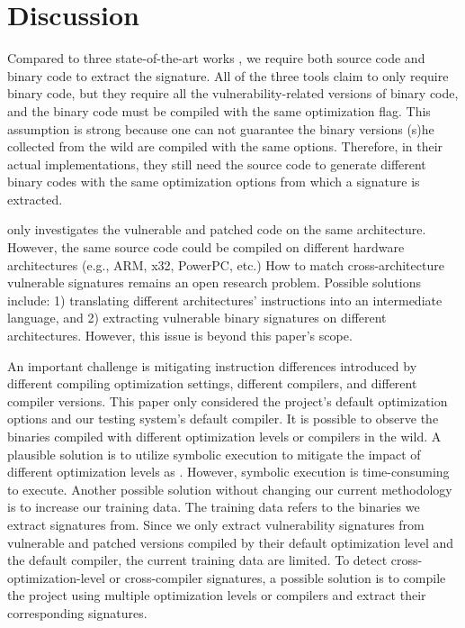 \section{Discussion}
\label{sec:dis}

 Compared to three state-of-the-art works \cite{vmpbl,binxray,viva}, we require both source code and binary code to extract the signature.
All of the three tools \cite{vmpbl,binxray,viva} claim to only require binary code, but they require all the vulnerability-related versions of binary code, and the binary code must be compiled with the same optimization flag. 
This assumption is strong because one can not guarantee the binary versions (s)he collected from the wild are compiled with the same options.
Therefore, in their actual implementations, they still need the source code to generate different binary codes with the same optimization options from which a signature is extracted.


\name only investigates the vulnerable and patched code on the same architecture.
However, the same source code could be compiled on different hardware architectures (e.g., ARM, x32, PowerPC, etc.) 
How to match cross-architecture vulnerable signatures remains an open research problem. 
Possible solutions include: 1) translating different architectures' instructions into an intermediate language, and 2) extracting vulnerable binary signatures on different architectures. 
However, this issue is beyond this paper's scope.

An important challenge is mitigating instruction differences introduced by different compiling optimization settings, different compilers, and different compiler versions. 
This paper only considered the project's default optimization options and our testing system's default compiler. 
It is possible to observe the binaries compiled with different optimization levels or compilers in the wild. 
A plausible solution is to utilize symbolic execution to mitigate the impact of different optimization levels as \cite{fiber}. 
However, symbolic execution is time-consuming to execute. 
Another possible solution without changing our current methodology is to increase our training data. The training data refers to the binaries we extract signatures from.
Since we only extract vulnerability signatures from vulnerable and patched versions compiled by their default optimization level and the default compiler, the current training data are limited. 
To detect cross-optimization-level or cross-compiler signatures, a possible solution is to compile the project using multiple optimization levels or compilers and extract their corresponding signatures.


